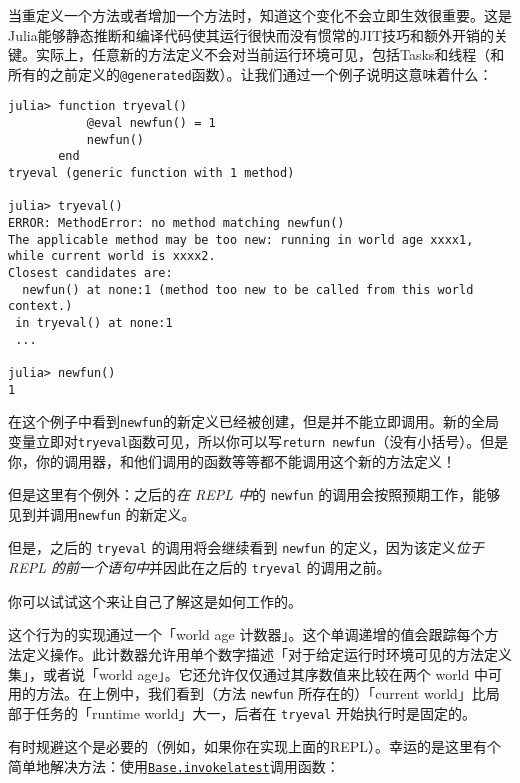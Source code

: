 当重定义一个方法或者增加一个方法时，知道这个变化不会立即生效很重要。这是Julia能够静态推断和编译代码使其运行很快而没有惯常的JIT技巧和额外开销的关键。实际上，任意新的方法定义不会对当前运行环境可见，包括Tasks和线程（和所有的之前定义的\texttt{@generated}函数）。让我们通过一个例子说明这意味着什么：




\begin{verbatim}
julia> function tryeval()
           @eval newfun() = 1
           newfun()
       end
tryeval (generic function with 1 method)

julia> tryeval()
ERROR: MethodError: no method matching newfun()
The applicable method may be too new: running in world age xxxx1, while current world is xxxx2.
Closest candidates are:
  newfun() at none:1 (method too new to be called from this world context.)
 in tryeval() at none:1
 ...

julia> newfun()
1
\end{verbatim}



在这个例子中看到\texttt{newfun}的新定义已经被创建，但是并不能立即调用。新的全局变量立即对\texttt{tryeval}函数可见，所以你可以写\texttt{return newfun}（没有小括号）。但是你，你的调用器，和他们调用的函数等等都不能调用这个新的方法定义！



但是这里有个例外：之后的\emph{在 REPL 中}的 \texttt{newfun} 的调用会按照预期工作，能够见到并调用\texttt{newfun} 的新定义。



但是，之后的 \texttt{tryeval} 的调用将会继续看到 \texttt{newfun} 的定义，因为该定义\emph{位于 REPL 的前一个语句中}并因此在之后的 \texttt{tryeval} 的调用之前。



你可以试试这个来让自己了解这是如何工作的。



这个行为的实现通过一个「world age 计数器」。这个单调递增的值会跟踪每个方法定义操作。此计数器允许用单个数字描述「对于给定运行时环境可见的方法定义集」，或者说「world age」。它还允许仅仅通过其序数值来比较在两个 world 中可用的方法。在上例中，我们看到（方法 \texttt{newfun} 所存在的）「current world」比局部于任务的「runtime world」大一，后者在 \texttt{tryeval} 开始执行时是固定的。



有时规避这个是必要的（例如，如果你在实现上面的REPL）。幸运的是这里有个简单地解决方法：使用\hyperlink{15240876280767285272}{\texttt{Base.invokelatest}}调用函数：





